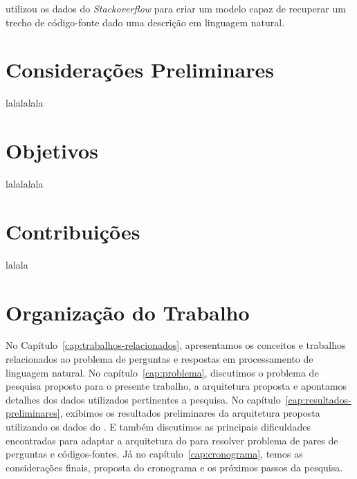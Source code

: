 \cite{Allamanis-bimodal-source-code-natural-language:2015} utilizou os dados do \textit{Stackoverflow} para criar um \gls{modelo} capaz de recuperar um trecho de código-fonte dado uma descrição em linguagem natural. 







\section{Considerações Preliminares}
\label{sec:consideracoes_preliminares}

lalalalala


\section{Objetivos}
\label{sec:objetivo}

lalalalala

\section{Contribuições}
\label{sec:contribucoes}

lalala

\section{Organização do Trabalho}
\label{sec:organizacao_trabalho}

No Capítulo~\ref{cap:trabalhos-relacionados}, apresentamos os conceitos e trabalhos relacionados ao problema de perguntas e respostas em processamento de linguagem natural. No capítulo~\ref{cap:problema}, discutimos o problema de pesquisa proposto para o presente trabalho, a arquitetura proposta e apontamos detalhes dos dados utilizados pertinentes a pesquisa. 
No capítulo~\ref{cap:resultados-preliminares}, exibimos os resultados preliminares da arquitetura proposta utilizando os dados do \cite{yao-2018}. E também discutimos as principais dificuldades encontradas para adaptar a arquitetura do \cite{feng-2015} para resolver problema de pares de perguntas e códigos-fontes. Já no capítulo~\ref{cap:cronograma}, temos as considerações finais, proposta do cronograma e os próximos passos da pesquisa.
